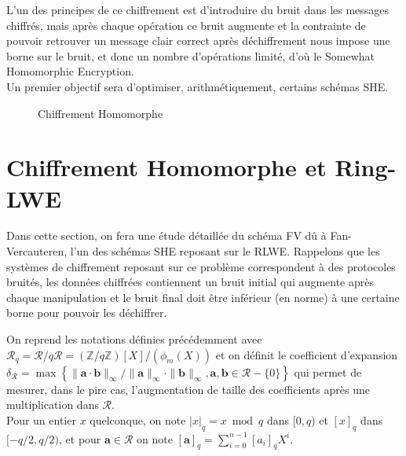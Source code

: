 \documentclass[11pt, headsepline, a4paper, fleqn, oneside]{article}
\begin{document}
L'un des principes de ce chiffrement est d'introduire du bruit dans les messages chiffrés, mais après chaque opération ce bruit augmente et la contrainte de pouvoir retrouver un message clair correct après déchiffrement nous impose une borne sur le bruit, et donc un nombre d'opérations limité, d'où le Somewhat Homomorphic Encryption.\\
Un premier objectif sera d'optimiser, arithmétiquement, certains schémas SHE.
\begin{figure}[width=0.4\linewidth]
\centering
{}
\caption{Chiffrement Homomorphe}
\end{figure}

\section{Chiffrement Homomorphe et Ring-LWE}
Dans cette section, on fera une étude détaillée du schéma FV dû à Fan-Vercauteren, l'un des schémas SHE reposant sur le RLWE.
Rappelons que les systèmes de chiffrement reposant sur ce problème correspondent à des protocoles bruités, les données chiffrées contiennent un bruit initial qui augmente après chaque manipulation et le bruit final doit être inférieur (en norme) à une certaine borne pour pouvoir les déchiffrer.

On reprend les notations définies précédemment avec $\mathcal{R}_{q}=\mathcal{R} / q \mathcal{R}=(\mathbb{Z} / q \mathbb{Z})[X] /\left(\phi_{m}(X)\right)$ et on définit le coefficient d'expansion $\delta_{\mathcal{R}}=\max \left\{\|\boldsymbol{a} \cdot \boldsymbol{b}\|_{\infty} /\|\boldsymbol{a}\|_{\infty} \cdot\|\boldsymbol{b}\|_{\infty}, \boldsymbol{a}, \boldsymbol{b} \in \mathcal{R}-\{0\} \right\}$ qui permet de mesurer, dans le pire cas, l'augmentation de taille des coefficients après une multiplication dans $\mathcal{R}$.\\
Pour un entier $x$ quelconque, on note $|x|_{q} = x \bmod{q}$ dans $[0, q)$ et $[x]_q$ dans $[-q/2, q/2)$, et pour $\boldsymbol{a} \in \mathcal{R}$ on note $[\boldsymbol{a}]_q = \sum_{i=0}^{n-1} [a_{i}]_q X^{i}$.
\end{document}

